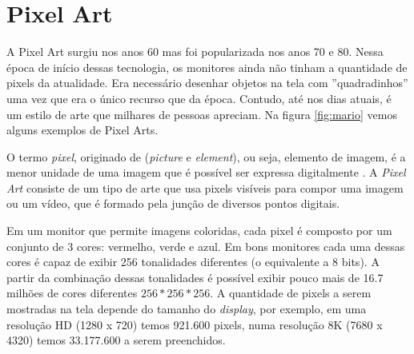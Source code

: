 


\section{Pixel Art}
\label{sec:pixel-art}
A Pixel Art surgiu nos anos 60 mas foi popularizada nos anos 70 e 80. Nessa época de início dessas tecnologia, os monitores ainda não tinham a quantidade de pixels da atualidade. Era necessário desenhar objetos na tela com ''quadradinhos'' uma vez que era o único recurso que da época. Contudo, até nos dias atuais, é um estilo de arte que milhares de pessoas apreciam. Na figura \ref{fig:mario} vemos alguns exemplos de Pixel Arts.

O termo \textit{pixel}, originado de (\textit{picture} e \textit{element}), ou seja, elemento de imagem, é a menor unidade de uma imagem que é possível ser expressa digitalmente \cite{lyon2006brief}. A \textit{Pixel Art} consiste de um tipo de arte que usa pixels visíveis para compor uma imagem ou um vídeo, que é formado pela junção de diversos pontos digitais.

Em um monitor que permite imagens coloridas, cada pixel é composto por um conjunto de 3 cores: vermelho, verde e azul. Em bons monitores cada uma dessas cores é capaz de exibir 256 tonalidades diferentes (o equivalente a 8 bits). A partir da combinação dessas tonalidades é possível exibir pouco mais de 16.7 milhões de cores diferentes \(256 * 256 * 256\). A quantidade de pixels a serem mostradas na tela depende do tamanho do \textit{display}, por exemplo, em uma resolução HD (1280 x 720) temos 921.600 pixels, numa resolução 8K (7680 x 4320) temos 33.177.600 a serem preenchidos.


